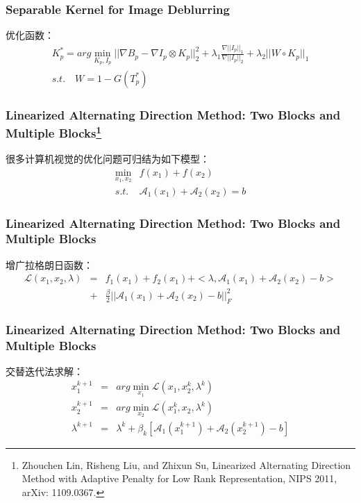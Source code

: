 \documentclass[notheorems,mathserif,table,compress]{beamer}  %
\begin{document}
\begin{frame}
\frametitle{Separable Kernel for Image Deblurring}
优化函数：
\begin{equation}
\begin{array}{c}
K_p^*= arg \min_{K_p,I_p}||\nabla B_p-\nabla I_p\otimes K_p||_2^2+\lambda_1\frac{\nabla ||I_p||_1}{\nabla ||I_p||_2}+\lambda_2||W\circ K_p||_1
\\s.t.\quad W=1-G(T^*_p)
\end{array}
\end{equation}
\end{frame}

\begin{frame}
\frametitle{Linearized Alternating Direction Method: Two Blocks and Multiple Blocks\footnote{Zhouchen Lin, Risheng Liu, and Zhixun Su, Linearized Alternating Direction Method with Adaptive Penalty for Low Rank Representation, NIPS 2011, arXiv: 1109.0367.}}
很多计算机视觉的优化问题可归结为如下模型：
\begin{equation}
\begin{array}{cc}
\min_{x_1,x_2} & f(x_1)+f(x_2)\\
s.t. & \mathcal{A}_1(x_1)+\mathcal{A}_2(x_2)=b
\end{array}
\end{equation}
\end{frame}

\begin{frame}
\frametitle{Linearized Alternating Direction Method: Two Blocks and Multiple Blocks}

增广拉格朗日函数：
\begin{equation}
\begin{array}{ccc}
\mathcal{L}(x_1,x_2,\lambda) & = & f_1(x_1)+f_2(x_1)+<\lambda,\mathcal{A}_1(x_1)+\mathcal{A}_2(x_2)-b>\\
& + & \frac{\beta}{2}||\mathcal{A}_1(x_1)+\mathcal{A}_2(x_2)-b||_F^2
\end{array}
\end{equation}
\end{frame}

\begin{frame}
\frametitle{Linearized Alternating Direction Method: Two Blocks and Multiple Blocks}

交替迭代法求解：
\begin{equation}
\begin{array}{ccc}
x_1^{k+1} & = & arg \min_{x_1} \mathcal{L}(x_1,x_2^k,\lambda^k)\\
x_2^{k+1} & = & arg \min_{x_2} \mathcal{L}(x_1^k,x_2,\lambda^k)\\
\lambda^{k+1} & = & \lambda^k+\beta_k[\mathcal{A}_1(x_1^{k+1})+\mathcal{A}_2(x_2^{k+1})-b]
\end{array}
\end{equation}
\end{frame}
\end{document}
